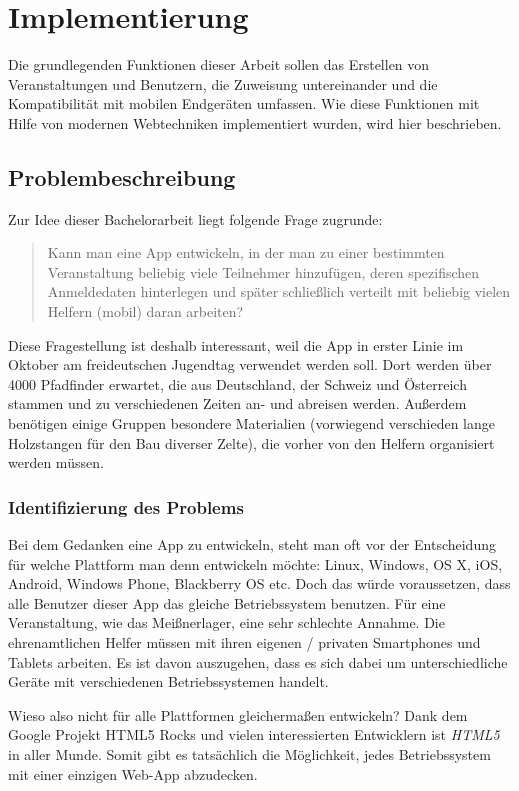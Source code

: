 \chapter{Implementierung}
Die grundlegenden Funktionen dieser Arbeit sollen das Erstellen von Veranstaltungen und Benutzern, die Zuweisung untereinander und die Kompatibilität mit mobilen Endgeräten umfassen. Wie diese Funktionen mit Hilfe von modernen Webtechniken implementiert wurden, wird hier beschrieben.

\section{Problembeschreibung}
Zur Idee dieser Bachelorarbeit liegt folgende Frage zugrunde:

\begin{quote}
	Kann man eine App entwickeln, in der man zu einer bestimmten Veranstaltung beliebig viele Teilnehmer hinzufügen, deren spezifischen Anmeldedaten hinterlegen und später schließlich verteilt mit beliebig vielen Helfern (mobil) daran arbeiten? 
\end{quote}

Diese Fragestellung ist deshalb interessant, weil die App in erster Linie im Oktober am freideutschen Jugendtag verwendet werden soll. Dort werden über 4000 Pfadfinder erwartet, die aus Deutschland, der Schweiz und Österreich stammen und zu verschiedenen Zeiten an- und abreisen werden. Außerdem benötigen einige Gruppen besondere Materialien (vorwiegend verschieden lange Holzstangen für den Bau diverser Zelte), die vorher von den Helfern organisiert werden müssen.

\subsection{Identifizierung des Problems}
Bei dem Gedanken eine App zu entwickeln, steht man oft vor der Entscheidung für welche Plattform man denn entwickeln möchte: Linux, Windows, OS X, iOS, Android, Windows Phone, Blackberry OS etc. Doch das würde voraussetzen, dass alle Benutzer dieser App das gleiche Betriebssystem benutzen. Für eine Veranstaltung, wie das Meißnerlager, eine sehr schlechte Annahme. Die ehrenamtlichen Helfer müssen mit ihren eigenen / privaten Smartphones und Tablets arbeiten. Es ist davon auszugehen, dass es sich dabei um unterschiedliche Geräte mit verschiedenen Betriebssystemen handelt.\par

Wieso also nicht für alle Plattformen gleichermaßen entwickeln? Dank dem Google Projekt \glqq HTML5 Rocks\grqq{}\cite{html5rocksmain} und vielen interessierten Entwicklern ist \emph{HTML5} in aller Munde. Somit gibt es tatsächlich die Möglichkeit, jedes Betriebssystem mit einer einzigen Web-App abzudecken.

